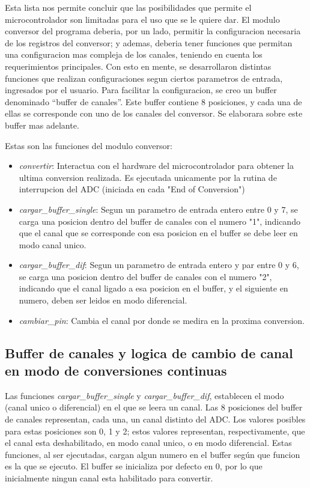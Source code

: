 Esta lista nos permite concluir que las posibilidades que permite el microcontrolador son limitadas para el uso que se le quiere dar. El modulo conversor del programa deberia, por un lado, permitir la configuracion necesaria de los registros del conversor; y ademas, deberia tener funciones que permitan una configuracion mas compleja de los canales, teniendo en cuenta los requerimientos principales.
Con esto en mente, se desarrollaron distintas funciones que realizan configuraciones segun ciertos parametros de entrada, ingresados por el usuario. Para facilitar la configuracion, se creo un buffer denominado ``buffer de canales''. Este buffer contiene 8 posiciones, y cada una de ellas se corresponde con uno de los canales del conversor. Se elaborara sobre este buffer mas adelante.

Estas son las funciones del modulo conversor:

\begin{itemize}
  \item \textit{convertir}: Interactua con el hardware del microcontrolador para obtener la ultima conversion realizada. Es ejecutada unicamente por la rutina de interrupcion del ADC (iniciada en cada "End of Conversion")
  \item \textit{cargar\_buffer\_single}: Segun un parametro de entrada entero entre 0 y 7, se carga una posicion dentro del buffer de canales con el numero "1", indicando que el canal que se corresponde con esa posicion en el buffer se debe leer en modo canal unico.
  \item \textit{cargar\_buffer\_dif}: Segun un parametro de entrada entero y par entre 0 y 6, se carga una posicion dentro del buffer de canales con el numero "2", indicando que el canal ligado a esa posicion en el buffer, y el siguiente en numero, deben ser leidos en modo diferencial.
  \item \textit{cambiar\_pin}: Cambia el canal por donde se medira en la proxima conversion.
\end{itemize}

\subsection{Buffer de canales y logica de cambio de canal en modo de conversiones continuas} %
\label{it2:sub:buffer_de_canales_y_logica_de_cambio_de_canal_en_modo_de_conversiones_continuas}

Las funciones \textit{cargar\_buffer\_single} y \textit{cargar\_buffer\_dif}, establecen el modo (canal unico o diferencial) en el que se leera un canal. Las 8 posiciones del buffer de canales representan, cada una, un canal distinto del ADC. Los valores posibles para estas posiciones son 0, 1 y 2; estos valores representan, respectivamente, que el canal esta deshabilitado, en modo canal unico, o en modo diferencial. Estas funciones, al ser ejecutadas, cargan algun numero en el buffer según que funcion es la que se ejecuto. El buffer se inicializa por defecto en 0, por lo que inicialmente ningun canal esta habilitado para convertir. \\

